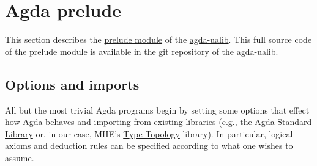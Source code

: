 \documentclass[sigplan,screen]{acmart}
\newcommand\preludemodule{\href{https://gitlab.com/ualib/ualib.gitlab.io/-/blob/master/prelude.lagda.rst}{prelude module}\xspace}
\newcommand{\agdaualib}{\href{https://ualib.org}{agda-ualib}\xspace}
\newcommand{\agdaualib}{\href{anonymizedLink/agda-ualib.html}{agda-ualib}\xspace}
\newcommand\preludemodule{\href{anonymizedLink/prelude.lagda.rst}{prelude module}\xspace}
\begin{document}



\section{Agda prelude}\label{agda-prelude}
This section describes the \preludemodule of the \agdaualib. This full source code of the \preludemodule is available in the
\href{anonymizedLink/agda-ualib.html}{git repository of the agda-ualib}.


\subsection{Options and imports}\label{options-and-imports}
All but the most trivial Agda programs begin by setting some options that effect how Agda behaves and importing from existing libraries (e.g., the \href{https://agda.github.io/agda-stdlib/}{Agda Standard Library} or, in our case, MHE's \href{https://github.com/martinescardo/TypeTopology}{Type Topology} library). In particular, logical axioms and deduction rules can be specified according to what one wishes to assume.
\end{document}
